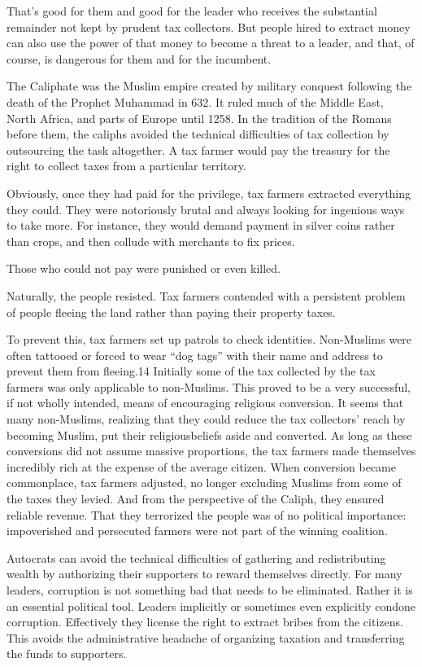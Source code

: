 \documentclass[10pt]{article}
\begin{document}
{\large That's good for them and good for the leader who receives the
substantial remainder not kept by prudent tax collectors. But people hired to
extract money can also use the power of that money to become a threat to a
leader, and that, of course, is dangerous for them and for the incumbent.}

{\large The Caliphate was the Muslim empire created by military conquest
following the death of the Prophet Muhammad in 632. It ruled much of the Middle
East, North Africa, and parts of Europe until 1258. In the tradition of the
Romans before them, the caliphs avoided the technical difficulties of tax
collection by outsourcing the task altogether. A tax farmer would pay the
treasury for the right to collect taxes from a particular territory.}

{\large Obviously, once they had paid for the privilege, tax farmers extracted
everything they could. They were notoriously brutal and always looking for
ingenious ways to take more. For instance, they would demand payment in silver
coins rather than crops, and then collude with merchants to fix prices.}

{\large Those who could not pay were punished or even killed.}

{\large Naturally, the people resisted. Tax farmers contended with a persistent
problem of people fleeing the land rather than paying their property taxes.}

{\large To prevent this, tax farmers set up patrols to check identities.
Non-Muslims were often tattooed or forced to wear ``dog tags'' with their name
and address to prevent them from fleeing.14 Initially some of the tax collected
by the tax farmers was only applicable to non-Muslims. This proved to be a very
successful, if not wholly intended, means of encouraging religious conversion. It
seems that many non-Muslims, realizing that they could reduce the tax collectors'
reach by becoming Muslim, put their religiousbeliefs aside and converted. As long
as these conversions did not assume massive proportions, the tax farmers made
themselves incredibly rich at the expense of the average citizen. When conversion
became commonplace, tax farmers adjusted, no longer excluding Muslims from some
of the taxes they levied. And from the perspective of the Caliph, they ensured
reliable revenue. That they terrorized the people was of no political importance:
impoverished and persecuted farmers were not part of the winning coalition.}

{\large Autocrats can avoid the technical difficulties of gathering and
redistributing wealth by authorizing their supporters to reward themselves
directly. For many leaders, corruption is not something bad that needs to be
eliminated. Rather it is an essential political tool. Leaders implicitly or
sometimes even explicitly condone corruption. Effectively they license the right
to extract bribes from the citizens. This avoids the administrative headache of
organizing taxation and transferring the funds to supporters.}
\end{document}

